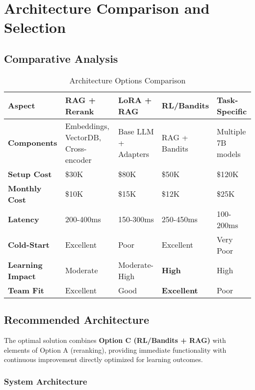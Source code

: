 \documentclass[11pt,a4paper]{report}
\begin{document}
\chapter{Architecture Comparison and Selection}

\section{Comparative Analysis}

\begin{table}[H]
\centering
\caption{Architecture Options Comparison}
\label{tab:architecture-comparison}
\begin{tabular}{p{3cm}p{3cm}p{3cm}p{3cm}p{3cm}}
\toprule
\textbf{Aspect} & \textbf{RAG + Rerank} & \textbf{LoRA + RAG} & \textbf{RL/Bandits} & \textbf{Task-Specific} \\
\midrule
\textbf{Components} & Embeddings, VectorDB, Cross-encoder & Base LLM + Adapters & RAG + Bandits & Multiple 7B models \\
\textbf{Setup Cost} & \$30K & \$80K & \$50K & \$120K \\
\textbf{Monthly Cost} & \$10K & \$15K & \$12K & \$25K \\
\textbf{Latency} & 200-400ms & 150-300ms & 250-450ms & 100-200ms \\
\textbf{Cold-Start} & Excellent & Poor & Excellent & Very Poor \\
\textbf{Learning Impact} & Moderate & Moderate-High & \textbf{High} & High \\
\textbf{Team Fit} & Excellent & Good & \textbf{Excellent} & Poor \\
\bottomrule
\end{tabular}
\end{table}

\section{Recommended Architecture}

The optimal solution combines \textbf{Option C (RL/Bandits + RAG)} with elements of Option A (reranking), providing immediate functionality with continuous improvement directly optimized for learning outcomes.

\subsection{System Architecture}
\end{document}
